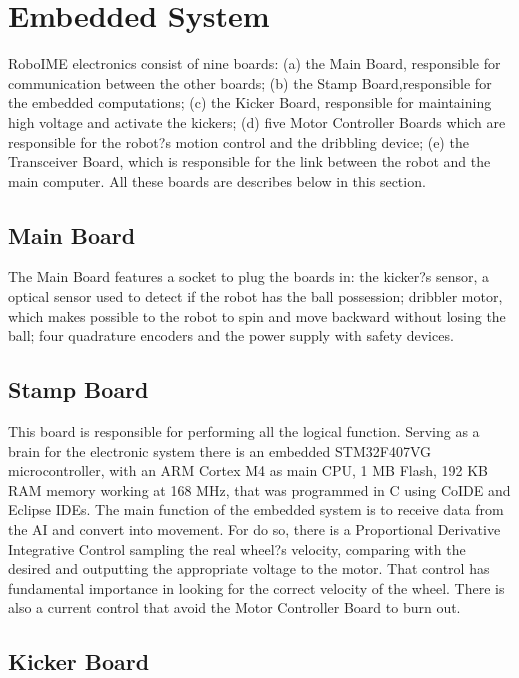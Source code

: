 \section{Embedded System}\label{emb_sys_sec}

RoboIME electronics consist of nine boards: (a) the Main Board, responsible for
communication between the other boards; (b) the Stamp Board,responsible for the
embedded computations; (c) the Kicker Board, responsible for maintaining high
voltage and activate the kickers; (d) five Motor Controller Boards which are
responsible for the robot?s motion control and the dribbling device; (e) the
Transceiver Board, which is responsible for the link between the robot and the
main computer. All these boards are describes below in this section.


\subsection{Main Board}

The Main Board features a socket to plug the boards in: the kicker?s sensor, a
optical sensor used to detect if the robot has the ball possession; dribbler
motor, which makes possible to the robot to spin and move backward without
losing the ball; four quadrature encoders and the power supply with safety
devices.


\subsection{Stamp Board}

This board is responsible for performing all the logical function. Serving as a
brain for the electronic system there is an embedded STM32F407VG
microcontroller, with an ARM Cortex M4 as main CPU, 1 MB Flash, 192 KB RAM
memory working at 168 MHz, that was programmed in C using CoIDE and Eclipse
IDEs. The main function of the embedded system is to receive data from the AI
and convert into movement. For do so, there is a Proportional Derivative
Integrative Control sampling the real wheel?s velocity, comparing with the
desired and outputting the appropriate voltage to the motor.
That control has fundamental importance in looking for the correct velocity of
the wheel. There is also a current control that avoid the Motor Controller
Board to burn out.



\subsection{Kicker Board}

